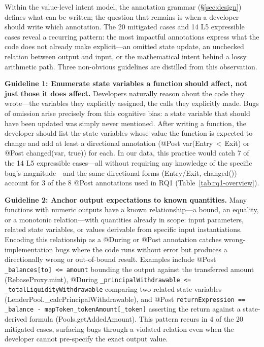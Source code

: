\documentclass[pdflatex,sn-basic]{sn-jnl}%
\theoremstyle{thmstyleone}%
\theoremstyle{thmstyletwo}%
\theoremstyle{thmstylethree}%
\begin{document}
Within the value-level intent model, the annotation grammar (§\ref{sec:design}) defines what can be written; the question that remains is when a developer should write which annotation.
The 20 mitigated cases and 14 L5 expressible cases reveal a recurring pattern: the most impactful annotations express what the code does not already make explicit---an omitted state update, an unchecked relation between output and input, or the mathematical intent behind a lossy arithmetic path.
Three non-obvious guidelines are distilled from this observation.

\smallskip
\noindent\textbf{Guideline 1: Enumerate state variables a function should affect, not just those it does affect.}
Developers naturally reason about the code they wrote---the variables they explicitly assigned, the calls they explicitly made.
Bugs of omission arise precisely from this cognitive bias: a state variable that should have been updated was simply never mentioned.
After writing a function, the developer should list the state variables whose value the function is expected to change and add at least a directional annotation (@Post var(Entry\,$<$\,Exit) or @Post changed(var, true)) for each.
In our data, this practice would catch 7 of the 14 L5 expressible cases---all without requiring any knowledge of the specific bug's magnitude---and the same directional forms (Entry/Exit, changed()) account for 3 of the 8 @Post annotations used in RQ1 (Table~\ref{tab:rq1-overview}).

\smallskip
\noindent\textbf{Guideline 2: Anchor output expectations to known quantities.}
Many functions with numeric outputs have a known relationship---a bound, an equality, or a monotonic relation---with quantities already in scope: input parameters, related state variables, or values derivable from specific input instantiations.
Encoding this relationship as a @During or @Post annotation catches wrong-implementation bugs where the code runs without error but produces a directionally wrong or out-of-bound result.
Examples include @Post \texttt{\_balances[to] <= amount} bounding the output against the transferred amount (RebaseProxy.mint), @During \texttt{\_principalWithdrawable <= \_totalLiquidityWithdrawable} comparing two related state variables (LenderPool.\_calcPrincipalWithdrawable), and @Post \texttt{returnExpression == \_balance - mapToken\_tokenAmount[\_token]} asserting the return against a state-derived formula (Pools.getAddedAmount).
This pattern recurs in 4 of the 20 mitigated cases, surfacing bugs through a violated relation even when the developer cannot pre-specify the exact output value.
\end{document}
